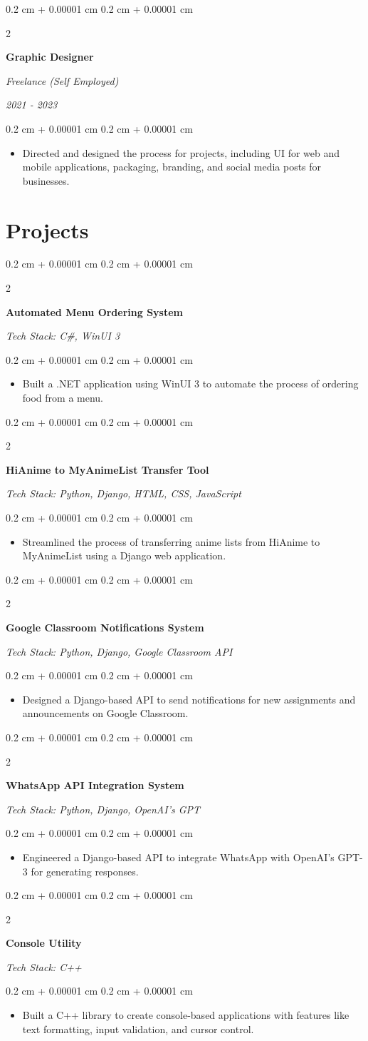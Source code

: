\documentclass[10pt, a4paper]{article}
\newenvironment{highlights}{
    \begin{itemize}[
        topsep=0.1 cm,
        parsep=0.1 cm,
        partopsep=0pt,
        itemsep=0pt,
        leftmargin=0.4 cm + 10pt
    ]
}{
    \end{itemize}
} %
\newenvironment{onecolentry}{
    \begin{adjustwidth}{
        0.2 cm + 0.00001 cm
    }{
        0.2 cm + 0.00001 cm
    }
}{
    \end{adjustwidth}
} %
\newenvironment{twocolentry}[2][]{
    \onecolentry
    \def\secondColumn{#2}
    \begin{paracol}{2}
}{
    \switchcolumn \raggedleft \secondColumn
    \end{paracol}
    \endonecolentry
} %
\newcommand{\createpointblock}[5]{%
    \begin{twocolentry}{%
        \textit{#2}

        \textit{#4}}
        \textbf{#1}

        \textit{#3}
    \end{twocolentry}

    \vspace{0.1 cm}
    \begin{onecolentry}
        \begin{highlights}
            #5
        \end{highlights}
    \end{onecolentry}
}
\let\hrefWithoutArrow\href
\renewcommand{\href}[2]{\hrefWithoutArrow{#1}{\ifthenelse{\equal{#2}{}}{ }{#2 }\raisebox{.15ex}{\footnotesize \faExternalLink*}}}
\begin{document}
    \vspace{0.2 cm}

    \createpointblock{Graphic Designer}{2021 - 2023}{Freelance (Self Employed)}{}
    {%
        \item Directed and designed the process for projects, including UI for web and mobile applications, packaging, branding, and social media posts for businesses.
    }

\section{Projects}

\createpointblock{Automated Menu Ordering System\href{https://github.com/abdbbdii/Automated-Menu-Ordering-System}{}}{}
{Tech Stack: C\#, WinUI 3}{}
{%
	\item Built a .NET application using WinUI 3 to automate the process of ordering food from a menu.
}

\vspace{0.2 cm}

\createpointblock{HiAnime to MyAnimeList Transfer Tool\href{https://github.com/abdbbdii/hianime-to-myanimelist}{}}{}
{Tech Stack: Python, Django, HTML, CSS, JavaScript}{}
{%
	\item Streamlined the process of transferring anime lists from HiAnime to MyAnimeList using a Django web application.
}

\vspace{0.2 cm}

\createpointblock{Google Classroom Notifications System\href{https://github.com/abdbbdii/Google_Classroom_API}{}}{}
{Tech Stack: Python, Django, Google Classroom API}{}
{%
	\item Designed a Django-based API to send notifications for new assignments and announcements on Google Classroom.
}

\vspace{0.2 cm}

\createpointblock{WhatsApp API Integration System\href{https://github.com/abdbbdii/Whatsapp_API}{}}{}
{Tech Stack: Python, Django, OpenAI's GPT}{}
{%
	\item Engineered a Django-based API to integrate WhatsApp with OpenAI's GPT-3 for generating responses.
}

\vspace{0.2 cm}

\createpointblock{Console Utility\href{https://github.com/abdbbdii/ConsoleUtility}{}}{}
{Tech Stack: C++}{}
{%
	\item Built a C++ library to create console-based applications with features like text formatting, input validation, and cursor control.
}
\end{document}
